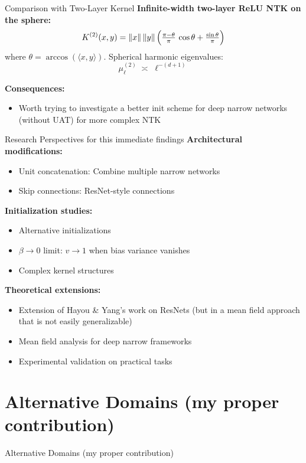\documentclass{beamer}
\begin{document}
\begin{frame}{Comparison with Two-Layer Kernel}
\textbf{Infinite-width two-layer ReLU NTK on the sphere:}
\[
  K^{(2)}(x,y)=\|x\|\,\|y\|\,\Bigl(\tfrac{\pi-\theta}{\pi}\,\cos \theta + \tfrac{\sin\theta}{\pi}\Bigr)
\]
where $\theta=\arccos(\langle x,y\rangle)$. Spherical harmonic eigenvalues:
\[
  \mu_\ell^{(2)}\;\asymp\;\ell^{-(d+1)}
\]

\textbf{Consequences:}
\begin{itemize}
  \item Worth trying to investigate a better init scheme for deep narrow networks (without UAT) for more complex NTK
\end{itemize}
\end{frame}

\begin{frame}{Research Perspectives for this immediate findings}
\textbf{Architectural modifications:}
\begin{itemize}
\item Unit concatenation: Combine multiple narrow networks
\item Skip connections: ResNet-style connections
\end{itemize}

\textbf{Initialization studies:}
\begin{itemize}
\item Alternative initializations
\item $\beta \to 0$ limit: $v \to 1$ when bias variance vanishes
\item Complex kernel structures
\end{itemize}

\textbf{Theoretical extensions:}
\begin{itemize}
\item Extension of Hayou \& Yang's work on ResNets (but in a mean field approach that is not easily generalizable)
\item Mean field analysis for deep narrow frameworks
\item Experimental validation on practical tasks
\end{itemize}
\end{frame}



\section{Alternative Domains (my proper contribution)}

\begin{frame}
\begin{center}
\huge{Alternative Domains}
\vspace{0.5cm}
\large{(my proper contribution)}
\end{center}
\end{frame}
\end{document}
